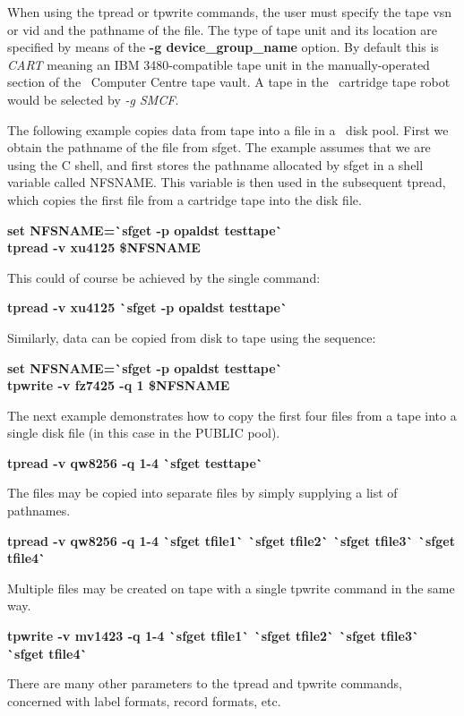When using the tpread or tpwrite commands, the user must specify the
tape vsn or vid and the pathname of the file. The type of tape unit and its
location are specified by means of the {\bf -g device\_group\_name}
option. By default this is {\it CART} meaning an IBM 3480-compatible
tape unit in the manually-operated section of the \CERN\ Computer Centre
tape vault. A tape in the \CERN\ cartridge tape robot would be
selected by {\it -g SMCF}.
 
The following example copies data from tape into a file in a \shift\ disk pool.
First we obtain the pathname of the file from sfget. The example assumes that we
are using the C shell, and first stores the pathname allocated by sfget in a
shell variable called NFSNAME.
This variable is then used in the subsequent
tpread, which copies the first file from a cartridge tape into the disk file.
 
{\bf set NFSNAME=\`{}sfget -p opaldst testtape\`{}\\
tpread -v xu4125 \$NFSNAME}
 
This could of course be achieved by the single command:
 
{\bf tpread -v xu4125 \`{}sfget -p opaldst testtape\`{}}
 
Similarly, data can be copied from disk to tape using the sequence:
 
{\bf set NFSNAME=\`{}sfget -p opaldst testtape\`{}\\
tpwrite -v fz7425 -q 1 \$NFSNAME}
 
The next example demonstrates how to copy the first four files
from a tape into a single disk file (in this case in the PUBLIC pool).
 
{\bf tpread -v qw8256 -q 1-4 \`{}sfget testtape\`{}}
 
The files may be copied into separate files by simply supplying
a list of pathnames.
 
{\bf tpread -v qw8256 -q 1-4 \`{}sfget tfile1\`{} \`{}sfget tfile2\`{} \`{}sfget
 tfile3\`{} \`{}sfget tfile4\`{}}
 
Multiple files may be created on tape with a single tpwrite command in the same
 way.
 
{\bf tpwrite -v mv1423 -q 1-4 \`{}sfget tfile1\`{} \`{}sfget tfile2\`{}
 \`{}sfget tfile3\`{} \`{}sfget tfile4\`{}}
 
There are many other parameters to the tpread and tpwrite commands,
concerned with label formats, record formats, etc.
 
